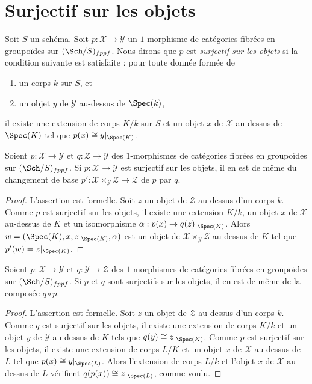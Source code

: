 \section{Surjectif sur les objets}
\label{section-formally-surjective}

\noindent
Soit $S$ un schéma. Soit $p : \mathcal{X} \to \mathcal{Y}$ un $1$-morphisme
de catégories fibrées en groupoïdes sur $(\Sch/S)_{fppf}$. Nous dirons que
$p$ est {\it surjectif sur les objets} si la condition suivante est satisfaite :
pour toute donnée formée de
\begin{enumerate}
\item un corps $k$ sur $S$, et
\item un objet $y$ de $\mathcal{Y}$ au-dessus de $\Spec(k)$,
\end{enumerate}
il existe une extension de corps $K/k$ sur $S$ et un
objet $x$ de $\mathcal{X}$ au-dessus de $\Spec(K)$
tel que $p(x) \cong y|_{\Spec(K)}$.

\begin{lemma}
\label{lemma-base-change-surjective}
Soient $p : \mathcal{X} \to \mathcal{Y}$ et $q : \mathcal{Z} \to \mathcal{Y}$
des $1$-morphismes de catégories fibrées en groupoïdes sur $(\Sch/S)_{fppf}$.
Si $p : \mathcal{X} \to \mathcal{Y}$ est surjectif sur les objets, il en
est de même du changement de base
$p' : \mathcal{X} \times_\mathcal{Y} \mathcal{Z} \to \mathcal{Z}$
de $p$ par $q$.
\end{lemma}

\begin{proof}
L'assertion est formelle. Soit $z$ un objet de $\mathcal{Z}$ au-dessus d'un corps $k$.
Comme $p$ est surjectif sur les objets, il existe une extension $K/k$,
un objet $x$ de $\mathcal{X}$ au-dessus de $K$ et un isomorphisme
$\alpha : p(x) \to q(z)|_{\Spec(K)}$. Alors
$w = (\Spec(K), x, z|_{\Spec(K)}, \alpha)$ est un objet de
$\mathcal{X} \times_\mathcal{Y} \mathcal{Z}$ au-dessus de $K$ tel que
$p'(w) = z|_{\Spec(K)}$.
\end{proof}

\begin{lemma}
\label{lemma-composition-surjective}
Soient $p : \mathcal{X} \to \mathcal{Y}$ et $q : \mathcal{Y} \to \mathcal{Z}$
des $1$-morphismes de catégories fibrées en groupoïdes sur $(\Sch/S)_{fppf}$.
Si $p$ et $q$ sont surjectifs sur les objets, il en est de même de la composée
$q \circ p$.
\end{lemma}

\begin{proof}
L'assertion est formelle. Soit $z$ un objet de $\mathcal{Z}$ au-dessus d'un corps $k$.
Comme $q$ est surjectif sur les objets, il existe une extension de corps $K/k$
et un objet $y$ de $\mathcal{Y}$ au-dessus de $K$ tels que
$q(y) \cong z|_{\Spec(K)}$. Comme $p$ est surjectif sur les objets, il
existe une extension de corps $L/K$ et un objet $x$ de $\mathcal{X}$
au-dessus de $L$ tel que $p(x) \cong y|_{\Spec(L)}$. Alors l'extension de corps
$L/k$ et l'objet $x$ de $\mathcal{X}$ au-dessus de $L$ vérifient
$q(p(x)) \cong z|_{\Spec(L)}$, comme voulu.
\end{proof}

